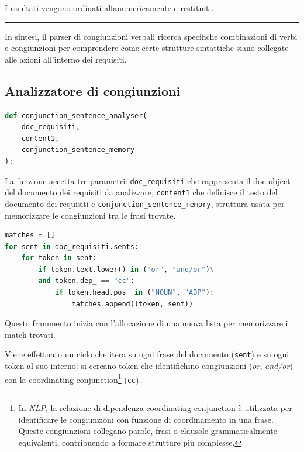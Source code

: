 \documentclass[12pt]{report}
\newcommand{\nlp}{\textsl{NLP}\xspace}
\begin{document}
\noindent I risultati vengono ordinati alfanumericamente e restituiti.


{\centering \rule{0.5\linewidth}{0.1pt} \par\vspace{0.25cm}}

In sintesi, il \textsf{parser di congiunzioni verbali} ricerca specifiche combinazioni di verbi e congiunzioni per comprendere come certe strutture sintattiche siano collegate alle azioni all'interno dei requisiti.


\subsection{Analizzatore di congiunzioni}
\label{subsec:analizzatore_congiunzioni}

\begin{mdframed}
\small
\begin{lstlisting}[language=Python]
def conjunction_sentence_analyser(
    doc_requisiti,
    content1,
    conjunction_sentence_memory
):
\end{lstlisting}
\end{mdframed}

\noindent La funzione accetta tre parametri: \texttt{doc\_requisiti} che rappresenta il doc-object del documento dei requisiti da analizzare, \texttt{content1} che definisce il testo del documento dei requisiti e \texttt{conjunction\_sentence\_memory}, struttura usata per memorizzare le congiunzioni tra le frasi trovate.


\begin{mdframed}
\small
\begin{lstlisting}[language=Python]
matches = []
for sent in doc_requisiti.sents:
    for token in sent:
        if token.text.lower() in ("or", "and/or")\
        and token.dep_ == "cc":
            if token.head.pos_ in ("NOUN", "ADP"):
                matches.append((token, sent))
\end{lstlisting}
\end{mdframed}

\noindent Questo frammento inizia con l'allocazione di una nuova lista per memorizzare i match trovati.

Viene effettuato un ciclo che itera su ogni frase del documento (\texttt{sent}) e su ogni token al suo interno: si cercano token che identifichino congiunzioni (\textit{or}, \textit{and/or}) con la coordinating-conjunction\footnote{In \nlp , la relazione di dipendenza coordinating-conjunction è utilizzata per identificare le congiunzioni con funzione di coordinamento in una frase. Queste congiunzioni collegano parole, frasi o clausole grammaticalmente equivalenti, contribuendo a formare strutture più complesse.} (\texttt{cc}).
\end{document}
